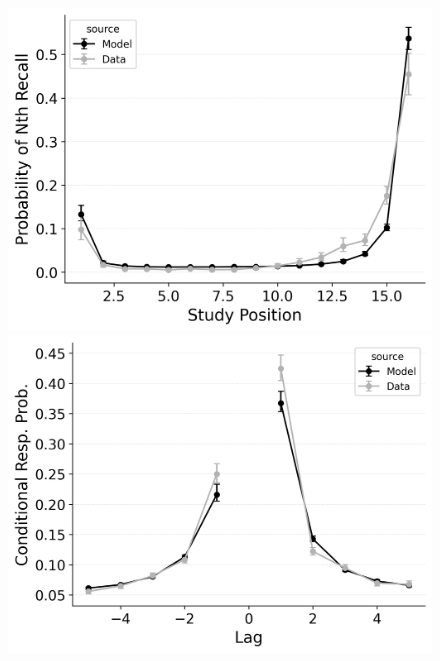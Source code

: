 \documentclass[
  man,
  floatsintext,
  longtable,
  nolmodern,
  notxfonts,
  notimes,
  draftfirst,
  colorlinks=true,linkcolor=blue,citecolor=blue,urlcolor=blue]{apa7}
\begin{document}
\begin{figure}
\begin{minipage}{0.33\linewidth}
\includegraphics{figures/bw_HealeyKahana2014_CRU_with_Feature-to-Context__Pre-Expt__Primacy__and_StartDrift_Fitting_pnr.png}\end{minipage}%
%
\begin{minipage}{0.33\linewidth}
\includegraphics{figures/bw_HealeyKahana2014_CRU_with_Feature-to-Context__Pre-Expt__Primacy__and_StartDrift_Fitting_crp.png}\end{minipage}%
%
\begin{minipage}{0.33\linewidth}

\end{minipage}
\end{figure}
\end{document}
